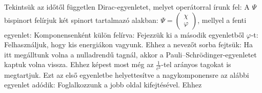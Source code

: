    Tekintsük az időtől független Dirac-egyenletet, melyet  operátorral írunk fel:
   A $\Psi$ bispinort felírjuk két spinort tartalmazó alakban: $\Psi=\begin{pmatrix}\chi\\ \varphi\end{pmatrix}$, mellyel a fenti egyenlet:
   Komponensenként külön felírva:
   Fejezzük ki a második egyenletből $\varphi$-t:
   Felhasználjuk, hogy kis energiákon vagyunk. Ehhez a nevezőt sorba fejtsük: 
   Ha itt megálltunk volna a nulladrendű tagnál, akkor a Pauli--Schrödinger-egyenletet kaptuk volna vissza. Ehhez képest most még az $\frac{1}{c^2}$-tel arányos tagokat is megtartjuk. Ezt az első egyenletbe helyettesítve a nagykomponensre az alábbi egyenlet adódik:
   Foglalkozzunk a jobb oldal kifejtésével. Ehhez
